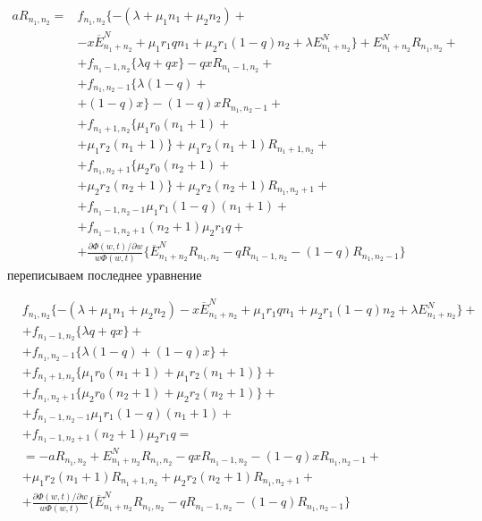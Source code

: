  \begin{equation*}
	\begin{split}
		aR_{n_{1}, n_{2}}=
		&f_{n_{1}, n_{2}}\{-(\lambda+\mu_{1}n_{1}+\mu_{2}n_{2}) +\\
		&-x\overline{E}_{n_{1}+n_{2}}^N+\mu_{1}r_{1}q n_{1}+ \mu_{2}r_{1}(1-q)n_{2}+ \lambda E_{n_{1}+n_{2}}^N\} + E_{n_{1}+n_{2}}^NR_{n_{1}, n_{2}} +\\
		&+f_{n_{1}-1, n_{2}}\{\lambda q+ q  x\}-q xR_{n_{1}-1, n_{2}}+\\
		&+ f_{n_{1}, n_{2}-1}\{\lambda (1-q) +\\
		&+ (1-q) x\} -(1-q) xR_{n_{1}, n_{2}-1}+ \\
		&+  f_{n_{1}+1, n_{2}}\{\mu_{1} r_{0}(n_{1}+1)+\\
		& + \mu_{1} r_{2}(n_{1}+1)\}+\mu_{1} r_{2}(n_{1}+1)R_{n_{1}+1, n_{2}}+\\
		&+ f_{n_{1}, n_{2}+1}\{\mu_{2} r_{0}(n_{2}+1)+\\
		& + \mu_{2} r_{2} (n_{2}+1)\} +\mu_{2} r_{2} (n_{2}+1)R_{n_{1}, n_{2}+1}+\\
		&+f_{n_{1}-1, n_{2}-1}\mu_{1} r_{1}(1-q)(n_{1}+1) +\\
		&+ f_{n_{1}-1, n_{2}+1}(n_{2}+1)\mu_{2} r_{1}q  +\\
		&+ \frac{\partial\Phi(w,t)/\partial w}{w\Phi(w,t)}\{ \overline{E}_{n_{1}+n_{2}}^NR_{n_{1}, n_{2}}-   q R_{n_{1}-1, n_{2}}- (1-q) R_{n_{1}, n_{2}-1}\}
	\end{split}
\end{equation*}
переписываем последнее уравнение

 \begin{equation}\label{sistemForF}
	\begin{split}
		&f_{n_{1}, n_{2}}\{-(\lambda+\mu_{1}n_{1}+\mu_{2}n_{2}) -x\overline{E}_{n_{1}+n_{2}}^N+\mu_{1}r_{1}q n_{1}+ \mu_{2}r_{1}(1-q)n_{2}+ \lambda E_{n_{1}+n_{2}}^N\}+\\
		&+f_{n_{1}-1, n_{2}}\{\lambda q+ q  x\}+\\
		&+ f_{n_{1}, n_{2}-1}\{\lambda (1-q) +(1-q) x\}+\\
		&+ f_{n_{1}+1, n_{2}}\{\mu_{1} r_{0}(n_{1}+1)+ \mu_{1} r_{2}(n_{1}+1)\}+\\
		&+ f_{n_{1}, n_{2}+1}\{\mu_{2} r_{0}(n_{2}+1) + \mu_{2} r_{2} (n_{2}+1)\}+\\
		&+f_{n_{1}-1, n_{2}-1}\mu_{1} r_{1}(1-q)(n_{1}+1) +\\
		&+ f_{n_{1}-1, n_{2}+1}(n_{2}+1)\mu_{2} r_{1}q  =\\
		& =-aR_{n_{1}, n_{2}}+ E_{n_{1}+n_{2}}^NR_{n_{1}, n_{2}} -q xR_{n_{1}-1, n_{2}} -(1-q) xR_{n_{1}, n_{2}-1}+\\
		& +\mu_{1} r_{2}(n_{1}+1)R_{n_{1}+1, n_{2}} +\mu_{2} r_{2} (n_{2}+1)R_{n_{1}, n_{2}+1}+\\
		&+ \frac{\partial\Phi(w,t)/\partial w}{w\Phi(w,t)}\{ \overline{E}_{n_{1}+n_{2}}^NR_{n_{1}, n_{2}}-   q R_{n_{1}-1, n_{2}}- (1-q) R_{n_{1}, n_{2}-1}\}
	\end{split}
\end{equation}

